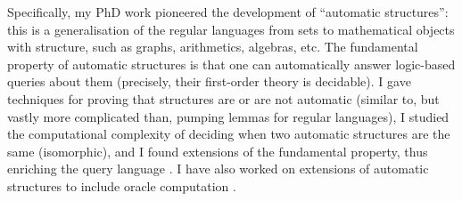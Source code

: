 \documentclass[10pt,a4paper,sans]{moderncv}
\begin{document}
Specifically, my PhD work pioneered the development of ``automatic structures'': this is a generalisation of the regular languages from sets to mathematical objects with structure, such as graphs, arithmetics, algebras, etc.  The fundamental property of automatic structures is that one can automatically answer logic-based queries about them (precisely, their first-order theory is decidable). I gave techniques for proving that structures are or are not automatic (similar to, but vastly more complicated than, pumping lemmas for regular languages), I studied the computational complexity of deciding when two automatic structures are the same (isomorphic), and I found extensions of the fundamental property, thus enriching the query language \cite{BGR11,DBLP:conf/lics/IshiharaKR02,DBLP:conf/lics/KhoussainovNRS04,DBLP:journals/lmcs/KhoussainovNRS07,DBLP:conf/lics/KhoussainovRS03,DBLP:conf/stacs/KhoussainovRS04,DBLP:journals/tocl/KhoussainovRS05,DBLP:journals/bsl/Rubin08}. I have also worked on extensions of automatic structures to include oracle computation \cite{DBLP:journals/corr/abs-1210-2462,DBLP:conf/lics/RabinovichR12}.
\newline


% 
% 






% 
 
\end{document}
